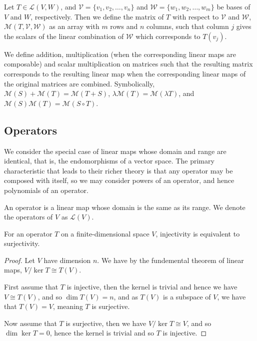 \documentclass[]{article}
\begin{document}
\begin{defi} [Matrix]
		Let $T \in \mathcal{L}(V,W)$, and $\mathcal{V} = \{v_1, v_2, \ldots, v_n\}$ and $\mathcal{W} = \{w_1, w_2, \ldots, w_m\}$ be bases of $V$ and $W$, respectively. Then we define the matrix of $T$ with respect to $\mathcal{V}$ and $\mathcal{W}$, $\mathcal{M}(T,  \mathcal{V}, \mathcal{W})$ as an array with $m$ rows and $n$ columns, such that column $j$ gives the scalars of the linear combination of $\mathcal{W}$ which corresponds to $T(v_j)$.

		We define addition, multiplication (when the corresponding linear maps are composable) and scalar multiplication  on matrices such that the resulting matrix corresponds to the resulting linear map when the corresponding linear maps of the original matrices are combined. Symbolically, $\mathcal{M}(S) + \mathcal{M}(T) = \mathcal{M}(T+S)$, $\lambda \mathcal{M}(T) = \mathcal{M}(\lambda T)$, and $\mathcal{M}(S) \mathcal{M}(T) = \mathcal{M}(S \circ T)$.
\end{defi}

\subsection{Operators}

We consider the special case of linear maps whose domain and range are identical, that is, the endomorphisms of a vector space. The primary characteristic that leads to their richer theory is that any operator may be composed with itself, so we may consider powers of an operator, and hence polynomials of an operator.

\begin{defi} [Operator]
		An operator is a linear map whose domain is the same as its range. We denote the operators of $V$ as $\mathcal{L}(V)$.
\end{defi}

\begin{thm}
		For an operator $T$ on a finite-dimensional space $V$, injectivity is equivalent to surjectivity.
\end{thm}

\begin{proof}
		Let $V$ have dimension $n$. We have by the fundemental theorem of linear maps, $V / \ker T \cong T(V)$. 

		First assume that $T$ is injective, then the kernel is trivial and hence we have $V \cong T(V)$, and so $\dim T(V) = n$, and as $T(V)$ is a subspace of $V$, we have that $T(V) = V$, meaning $T$ is surjective. 

		Now assume that $T$ is surjective, then we have $V / \ker T \cong V$, and so $\dim \ker T = 0$, hence the kernel is trivial and so $T$ is injective.
\end{proof}
\end{document}
